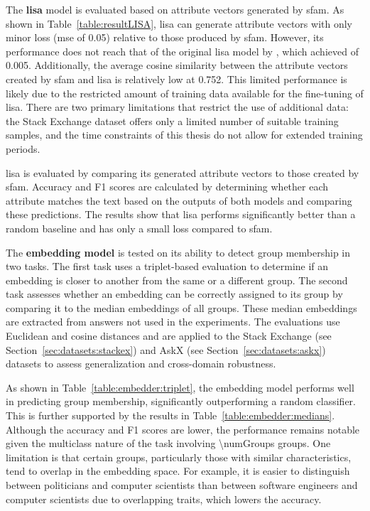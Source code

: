 The \textbf{\acs{lisa}} model is evaluated based on attribute vectors generated by \ac{sfam}. As shown in Table~\ref{table:resultLISA}, \ac{lisa} can generate attribute vectors with only minor loss (\acs{mse} of \num{0.05}) relative to those produced by \ac{sfam}. However, its performance does not reach that of the original \ac{lisa} model by \citet{patelLearningInterpretableStyle2023}, which achieved  of \num{0.005}. Additionally, the average cosine similarity between the attribute vectors created by \ac{sfam} and \ac{lisa} is relatively low at \num{0.752}. This limited performance is likely due to the restricted amount of training data available for the fine-tuning of \ac{lisa}. There are two primary limitations that restrict the use of additional data: the Stack Exchange dataset offers only a limited number of suitable training samples, and the time constraints of this thesis do not allow for extended training periods.

\begin{table}[ht]
  \caption[]{\ac{lisa} is evaluated by comparing its generated attribute vectors to those created by \ac{sfam}. Accuracy and F1 scores are calculated by determining whether each attribute matches the text based on the outputs of both models and comparing these predictions. The results show that \ac{lisa} performs significantly better than a random baseline and has only a small loss compared to \ac{sfam}.}%
  \label{table:resultLISA}
  \centering
  \resultLisa{}
\end{table}

The \textbf{embedding model} is tested on its ability to detect group membership in two tasks. The first task uses a triplet-based evaluation to determine if an embedding is closer to another from the same or a different group. The second task assesses whether an embedding can be correctly assigned to its group by comparing it to the median embeddings of all groups. These median embeddings are extracted from answers not used in the experiments. The evaluations use Euclidean and cosine distances and are applied to the Stack Exchange (see Section~\ref{sec:datasets:stackex}) and AskX (see Section~\ref{sec:datasets:askx}) datasets to assess generalization and cross-domain robustness.

As shown in Table~\ref{table:embedder:triplet}, the embedding model performs well in predicting group membership, significantly outperforming a random classifier. This is further supported by the results in Table~\ref{table:embedder:medians}. Although the accuracy and F1 scores are lower, the performance remains notable given the multiclass nature of the task involving \num{\numGroups} groups. One limitation is that certain groups, particularly those with similar characteristics, tend to overlap in the embedding space. For example, it is easier to distinguish between politicians and computer scientists than between software engineers and computer scientists due to overlapping traits, which lowers the accuracy.


